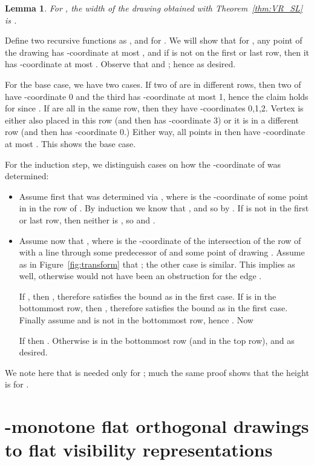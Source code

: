 \documentclass{elsarticle}
\newtheorem{lemma}{Lemma}
\newenvironment{proof}{{\bf Proof: }}{\hspace*{\fill}\medskip}
\begin{document}
\begin{lemma}
For , the width of the drawing obtained with 
Theorem~\ref{thm:VR_SL} is .
\end{lemma}
\begin{proof}
Define two recursive functions as , 
 and  for . 
We will show that for , 
any point  of the drawing 
has -coordinate at most , and if 
is not on the first or last row, then it has
-coordinate at most .
Observe that 
and ; hence  as desired.

For the base case, we have two cases.  If two of 
are in different rows, then two of  have
-coordinate 0 and the third has -coordinate at most 1, hence
the claim holds for  since .  If 
are all in the same row, then they have -coordinates 0,1,2.  Vertex
 is either also placed in this row (and then has -coordinate 3)
or it is in a different row (and then has -coordinate 0.)  Either way,
all points in  then have -coordinate at most
.  This shows the base case.

For the induction step, we distinguish cases on how the -coordinate 
of  was determined:
\begin{itemize}
\item Assume first that  was determined via , where  is the -coordinate of some point  in 
 in the row of .  By induction we know that
, and so 
by .
If  is not in the first or last row, then neither is , so
 and .

\item Assume now that , where 
is the -coordinate of the intersection of the row of  with
a line  through some predecessor 
of  and some point  of drawing .
Assume as in Figure~\ref{fig:transform} that
; the other case is
similar.  
This implies  as well, otherwise  would
not have been an obstruction for the edge .  

If , then , therefore
 satisfies the bound as in the first case.
If  is in the bottommost row, then , therefore
 satisfies the bound as in the first case.
Finally assume  and  is not in the bottommost
row, hence .
Now

If  then .  Otherwise  is in the
bottommost row (and  in the top row), and 
 as desired.
\end{itemize}
\end{proof}

We note here that  is needed only for ; much the same proof shows that the height is 
for .

\section{-monotone flat orthogonal drawings to flat visibility 
representations}
\end{document}
